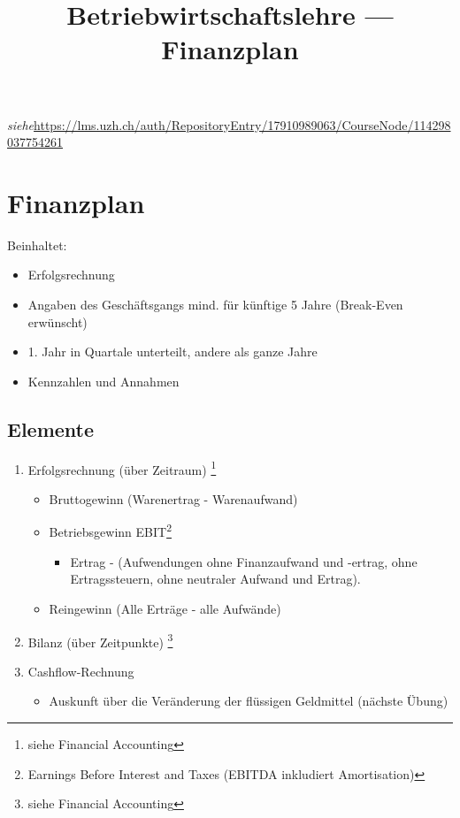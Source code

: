 \documentclass[a4paper]{article}
\title{\textbf{Betriebwirtschaftslehre — Finanzplan}}
\begin{document}
    \maketitle
    \textit{siehe}\url{https://lms.uzh.ch/auth/RepositoryEntry/17910989063/CourseNode/114298037754261}
    \section{Finanzplan}
    Beinhaltet:
    \begin{itemize}
        \item Erfolgsrechnung
        \item Angaben des Geschäftsgangs mind. für künftige 5 Jahre (Break-Even erwünscht)
        \item 1. Jahr in Quartale unterteilt, andere als ganze Jahre
        \item Kennzahlen und Annahmen
    \end{itemize}

    \subsection{Elemente}

\begin{enumerate}
    \item Erfolgsrechnung (über Zeitraum) \footnote{siehe Financial Accounting} 
    \begin{itemize}
        \item Bruttogewinn (Warenertrag - Warenaufwand)
        \item Betriebsgewinn EBIT\footnote{Earnings Before Interest and Taxes (EBITDA inkludiert Amortisation)}
        \begin{itemize}
            \item  Ertrag - (Aufwendungen ohne Finanzaufwand und -ertrag,
ohne Ertragssteuern, ohne neutraler Aufwand und Ertrag).
        \end{itemize}
        \item Reingewinn (Alle Erträge - alle Aufwände)
    \end{itemize}
    \item Bilanz (über Zeitpunkte) \footnote{siehe Financial Accounting}
    \item Cashflow-Rechnung 
    \begin{itemize}
        \item Auskunft über die Veränderung der flüssigen Geldmittel (nächste Übung)
    \end{itemize} 
\end{enumerate}
\end{document}
